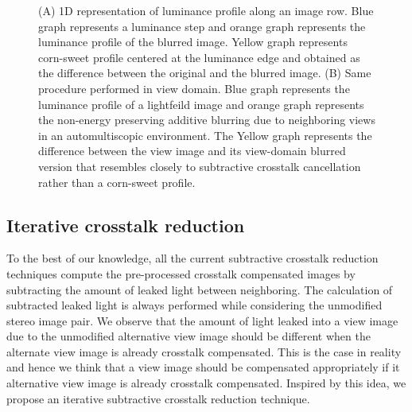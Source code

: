 \begin{figure}[htbp]
    \caption{(A) 1D representation of luminance profile along an image row. Blue graph represents a luminance step and orange graph represents the luminance profile of the blurred image. Yellow graph represents corn-sweet profile centered at the luminance edge and obtained as the difference between the original and the blurred image.  (B) Same procedure performed in view domain. Blue graph represents the luminance profile of a lightfeild image and orange graph represents the non-energy preserving additive blurring due to neighboring views in an automultiscopic environment. The Yellow graph represents the difference between the view image and its view-domain blurred version that resembles closely to subtractive crosstalk cancellation rather than a corn-sweet profile.\label{fig:why_no_cornsweet}}
\end{figure}

\subsection{Iterative crosstalk reduction}

To the best of our knowledge, all the current subtractive crosstalk reduction techniques compute the pre-processed crosstalk compensated images by subtracting the amount of leaked light between neighboring. The calculation of subtracted leaked light is always performed while considering the unmodified stereo image pair. We observe that the amount of light leaked into a view image due to the unmodified alternative view image should be different when the alternate view image is already crosstalk compensated. This is the case in reality and hence we think that a view image should be compensated appropriately if it alternative view image is already crosstalk compensated. Inspired by this idea, we propose an iterative subtractive crosstalk reduction technique.

